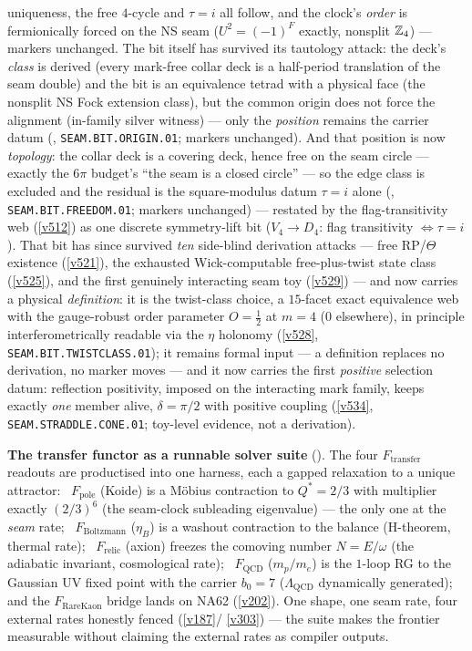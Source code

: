 uniqueness, the free $4$-cycle and $\tau=i$ all follow, and the clock's \emph{order} is fermionically
forced on the NS seam ($U^2=(-1)^F$ exactly, nonsplit $\mathbb Z_4$) --- markers unchanged. The bit itself
has survived its tautology attack: the deck's \emph{class} is derived (every mark-free collar deck is
a half-period translation of the seam double) and the bit is an equivalence tetrad with a physical
face (the nonsplit NS Fock extension class), but the common origin does not force the alignment
(in-family silver witness) --- only the \emph{position} remains the carrier datum
(, \texttt{SEAM.BIT.ORIGIN.01}; markers unchanged). And that
position is now \emph{topology}: the collar deck is a covering deck, hence free on the seam circle
--- exactly the $6\pi$ budget's ``the seam is a closed circle'' --- so the edge class is excluded
and the residual is the square-modulus datum $\tau=i$ alone
(, \texttt{SEAM.BIT.FREEDOM.01}; markers unchanged) ---
restated by the flag-transitivity web (\vref{v512}) as one discrete symmetry-lift bit
($V_4\to D_4$: flag transitivity $\iff\tau=i$). That bit has since survived \emph{ten}
side-blind derivation attacks --- free RP/$\Theta$ existence (\vref{v521}), the exhausted
Wick-computable free-plus-twist state class (\vref{v525}), and the first genuinely interacting
seam toy (\vref{v529}) --- and now carries a physical \emph{definition}: it is the twist-class
choice, a $15$-facet exact equivalence web with the gauge-robust order parameter $O=\tfrac12$
at $m=4$ ($0$ elsewhere), in principle interferometrically readable via the $\eta$ holonomy
(\vref{v528}, \texttt{SEAM.BIT.TWISTCLASS.01}); it remains formal input --- a definition
replaces no derivation, no marker moves --- and it now carries the first \emph{positive}
selection datum: reflection positivity, imposed on the interacting mark family, keeps exactly
\emph{one} member alive, $\delta=\pi/2$ with positive coupling
(\vref{v534}, \texttt{SEAM.STRADDLE.CONE.01}; toy-level evidence, not a derivation).

\par\smallskip\noindent\textbf{The transfer functor as a runnable solver suite}
(). The four $F_{\mathrm{transfer}}$ readouts are productised into one harness, each
a gapped relaxation to a unique attractor: \mE\ $F_{\mathrm{pole}}$ (Koide) is a M\"obius contraction to
$Q^*{=}2/3$ with multiplier exactly $(2/3)^6$ (the seam-clock subleading eigenvalue) --- the only one at the
\emph{seam} rate; \mC\ $F_{\mathrm{Boltzmann}}$ ($\eta_B$) is a washout contraction to the balance (H-theorem,
thermal rate); \mC\ $F_{\mathrm{relic}}$ (axion) freezes the comoving number $N{=}E/\omega$ (the adiabatic
invariant, cosmological rate); \mE\ $F_{\mathrm{QCD}}$ ($m_p/m_e$) is the $1$-loop RG to the Gaussian UV fixed
point with the carrier $b_0{=}7$ ($\Lambda_{\mathrm{QCD}}$ dynamically generated); and the $F_{\mathrm{RareKaon}}$
bridge lands on NA62 (\vref{v202}). One shape, one seam rate, four external rates honestly fenced (\vref{v187}/
\vref{v303}) --- the suite makes the frontier measurable without claiming the external rates as compiler outputs.

